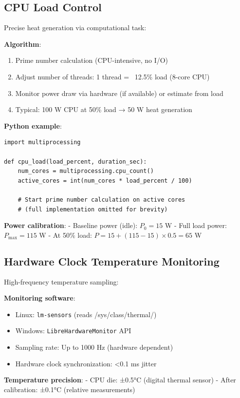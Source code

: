 \documentclass[12pt,a4paper]{article}
\begin{document}
\subsection{CPU Load Control}

Precise heat generation via computational task:

\textbf{Algorithm}:
\begin{enumerate}
\item Prime number calculation (CPU-intensive, no I/O)
\item Adjust number of threads: 1 thread = ~12.5\% load (8-core CPU)
\item Monitor power draw via hardware (if available) or estimate from load
\item Typical: 100 W CPU at 50\% load → 50 W heat generation
\end{enumerate}

\textbf{Python example}:
\begin{verbatim}
import multiprocessing

def cpu_load(load_percent, duration_sec):
    num_cores = multiprocessing.cpu_count()
    active_cores = int(num_cores * load_percent / 100)
    
    # Start prime number calculation on active cores
    # (full implementation omitted for brevity)
\end{verbatim}

\textbf{Power calibration}:
- Baseline power (idle): $P_0 = 15$ W
- Full load power: $P_{\text{max}} = 115$ W
- At 50\% load: $P = 15 + (115-15) \times 0.5 = 65$ W

\subsection{Hardware Clock Temperature Monitoring}

High-frequency temperature sampling:

\textbf{Monitoring software}:
\begin{itemize}
\item Linux: \texttt{lm-sensors} (reads /sys/class/thermal/)
\item Windows: \texttt{LibreHardwareMonitor} API
\item Sampling rate: Up to 1000 Hz (hardware dependent)
\item Hardware clock synchronization: <0.1 ms jitter
\end{itemize}

\textbf{Temperature precision}:
- CPU die: ±0.5°C (digital thermal sensor)
- After calibration: ±0.1°C (relative measurements)
\end{document}
